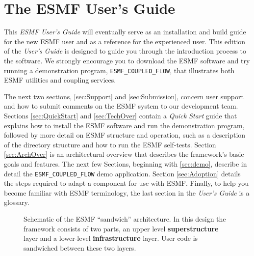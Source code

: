 \section{The ESMF User's Guide}

This {\it ESMF User's Guide} will eventually serve as an installation
and build guide for
the new ESMF user and as a reference for the experienced user.  This
edition of the {\it User's Guide} is designed to guide you through the
introduction process to the software.  We strongly encourage you to
download the ESMF software and try running a demonstration program, 
{\tt ESMF\_COUPLED\_FLOW}, that illustrates both ESMF utilities and 
coupling services.

The next two sections, \ref{sec:Support} and \ref{sec:Submission}, 
concern user support and how to submit comments on the ESMF system 
to our development team.  
Sections \ref{sec:QuickStart} and \ref{sec:TechOver} contain a {\it Quick
Start} guide that explains how to install the ESMF software and run the
demonstration program, followed by more detail on ESMF structure and
operation, such as a description of the directory structure and how to run
the ESMF self-tests.
Section \ref{sec:ArchOver} is an architectural overview that describes the
framework's basic goals and features.  The next few Sections, beginning
with \ref{sec:demo}, describe in detail the {\tt ESMF\_COUPLED\_FLOW} demo
application.
Section \ref{sec:Adoption} details the steps required to adapt a component
for use with ESMF.  Finally, to help you become familiar with ESMF
terminology, the last section in the {\it User's Guide} is a glossary.

\begin{center}
\begin{figure}
\caption{Schematic of the ESMF ``sandwich'' architecture. In this 
design the framework consists of two parts, an upper level
{\bf superstructure} layer and a lower-level {\bf infrastructure} layer. 
User code is sandwiched between these two layers.}
\label{fig:TheESMFwich}
\end{figure}
\end{center}


